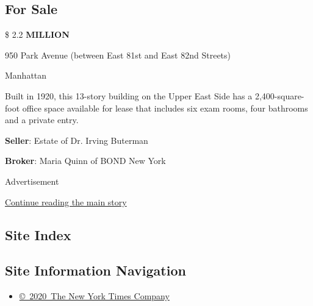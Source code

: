 \hypertarget{for-sale}{%
\subsection{For Sale}\label{for-sale}}

\$ 2.2 \textbf{MILLION}

950 Park Avenue (between East 81st and East 82nd Streets)

Manhattan

Built in 1920, this 13-story building on the Upper East Side has a
2,400-square-foot office space available for lease that includes six
exam rooms, four bathrooms and a private entry.

\textbf{Seller}: Estate of Dr. Irving Buterman

\textbf{Broker}: Maria Quinn of BOND New York

Advertisement

\protect\hyperlink{after-bottom}{Continue reading the main story}

\hypertarget{site-index}{%
\subsection{Site Index}\label{site-index}}

\hypertarget{site-information-navigation}{%
\subsection{Site Information
Navigation}\label{site-information-navigation}}

\begin{itemize}
\tightlist
\item
  \href{https://help.nytimes.com/hc/en-us/articles/115014792127-Copyright-notice}{©~2020~The
  New York Times Company}
\end{itemize}

